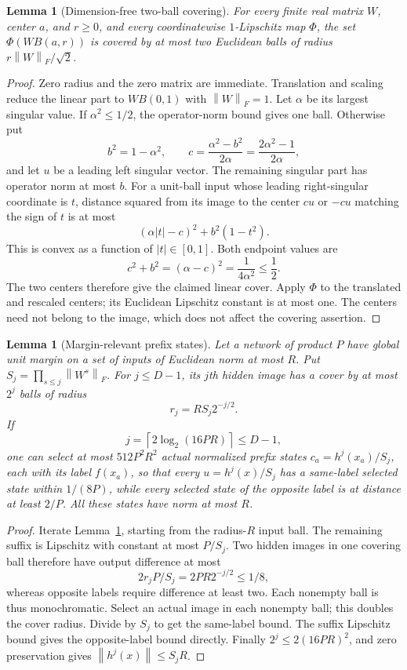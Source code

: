 \documentclass[11pt]{article}
\newtheorem{lemma}[theorem]{Lemma}
\theoremstyle{remark}
\newcommand{\norm}[1]{\left\lVert #1\right\rVert}
\begin{document}
\begin{lemma}[Dimension-free two-ball covering]
\label{lem:two-ball}
For every finite real matrix $W$, center $a$, and $r\ge0$, and every
coordinatewise $1$-Lipschitz map $\Phi$, the set
$\Phi(W B(a,r))$ is covered by at most two Euclidean balls of radius
$r\norm W_F/\sqrt2$.
\end{lemma}
\begin{proof}
Zero radius and the zero matrix are immediate. Translation and scaling
reduce the linear part to $W B(0,1)$ with $\norm W_F=1$.
Let $\alpha$ be its largest singular value. If $\alpha^2\le1/2$,
the operator-norm bound gives one ball. Otherwise put
\[
 b^2=1-\alpha^2,\qquad
 c=\frac{\alpha^2-b^2}{2\alpha}
   =\frac{2\alpha^2-1}{2\alpha},
\]
and let $u$ be a leading left singular vector. The remaining singular
part has operator norm at most $b$. For a unit-ball input whose leading
right-singular coordinate is $t$, distance squared from its image to
the center $cu$ or $-cu$ matching the sign of $t$ is at most
\[
  (\alpha |t|-c)^2+b^2(1-t^2).
\]
This is convex as a function of $|t|\in[0,1]$. Both endpoint values are
\[
 c^2+b^2=(\alpha-c)^2=\frac1{4\alpha^2}\le\frac12.
\]
The two centers therefore give the claimed linear cover. Apply
$\Phi$ to the translated and rescaled centers; its Euclidean
Lipschitz constant is at most one. The centers need not belong to the
image, which does not affect the covering assertion.
\end{proof}

\begin{lemma}[Margin-relevant prefix states]
\label{lem:prefix}
Let a network of product $P$ have global unit margin on a set of inputs
of Euclidean norm at most $R$. Put
$S_j=\prod_{s\le j}\norm{W^s}_F$. For $j\le D-1$, its $j$th hidden
image has a cover by at most $2^j$ balls of radius
\[
 r_j=R S_j 2^{-j/2}.
\]
If
\[
 j=\left\lceil2\log_2(16PR)\right\rceil\le D-1,
\]
one can select at most $512P^2R^2$ actual normalized prefix states
$c_a=h^j(x_a)/S_j$, each with its label $f(x_a)$, so that every
$u=h^j(x)/S_j$ has a same-label selected state within $1/(8P)$,
while every selected state of the opposite label is at distance at
least $2/P$. All these states have norm at most $R$.
\end{lemma}
\begin{proof}
Iterate Lemma~\ref{lem:two-ball}, starting from the radius-$R$ input
ball. The remaining suffix is Lipschitz with constant at most $P/S_j$.
Two hidden images in one covering ball therefore have output
difference at most
\[
 2r_jP/S_j=2PR2^{-j/2}\le1/8,
\]
whereas opposite labels require difference at least two. Each nonempty
ball is thus monochromatic. Select an actual image in each nonempty
ball; this doubles the cover radius. Divide by $S_j$ to get the
same-label bound. The suffix Lipschitz bound gives the opposite-label
bound directly. Finally $2^j\le2(16PR)^2$, and zero preservation gives
$\norm{h^j(x)}\le S_jR$.
\end{proof}
\end{document}
